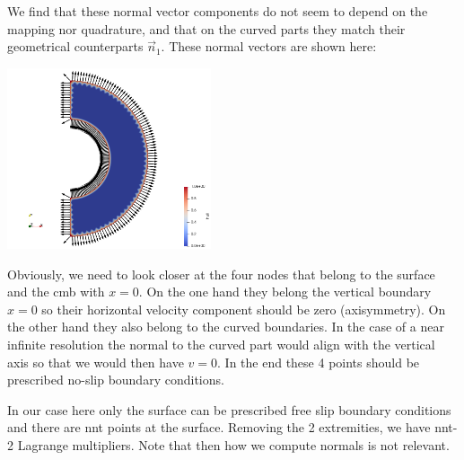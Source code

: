 We find that these normal vector components do not seem to depend on the mapping nor quadrature,
and that on the curved parts they match their geometrical counterparts $\vec{n}_1$.
These normal vectors are shown here:

\begin{center}
\includegraphics[width=6cm]{python_codes/fieldstone_152/RESULTS/normals/normals}
\end{center}

Obviously, we need to look closer at the four nodes that belong to the surface and the cmb with $x=0$.
On the one hand they belong the vertical boundary $x=0$ so their horizontal velocity component should be zero (axisymmetry).
On the other hand they also belong to the curved boundaries. In the case of a near infinite resolution the 
normal to the curved part would align with the vertical axis so that we would then have $v=0$. 
In the end these 4 points should be prescribed no-slip boundary conditions.

In our case here only the surface can be prescribed free slip boundary conditions and there are {\python nnt} points at the surface.
Removing the 2 extremities, we have {\python nnt-2} Lagrange multipliers. Note that then how we compute normals is not relevant.


